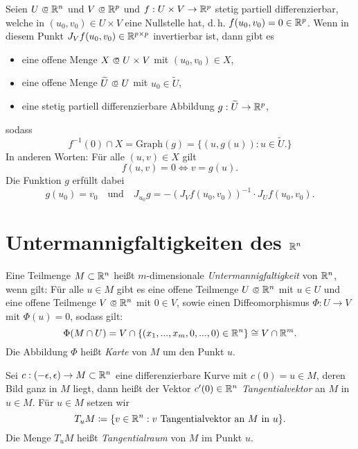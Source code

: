 \documentclass{cheat-sheet}
\newcommand\opn{\mathrel{\ooalign{$\subset$\cr
  \hidewidth\raise.1ex\hbox{$\circ\mkern.5mu$}\cr}}}
\begin{document}
\begin{samepage}

\begin{satz}
Seien $U \opn \R^n$ und $V \opn \R^p$ und $f : U \times V \to \mathbb{R}^p$ stetig partiell differenzierbar, welche in $(u_0, v_0) \in U \times V$ eine Nullstelle hat, d.\,h. $f(u_0, v_0) = 0 \in \mathbb{R}^p$. Wenn in diesem Punkt $J_V f(u_0, v_0) \in \mathbb{R}^{p \times p}$ invertierbar ist, dann gibt es
\begin{itemize}
  \item eine offene Menge $X \opn U \times V$ mit $(u_0, v_0) \in X$,
  \item eine offene Menge $\widetilde{U} \opn U$ mit $u_0 \in \widetilde{U}$,
  \item eine stetig partiell differenzierbare Abbildung $g : \widetilde{U} \to \mathbb{R}^p$,
\end{itemize}
sodass
\[ f^{-1}(0) \cap X = \mathrm{Graph}(g) = \{ (u, g(u)) : u \in \widetilde{U}. \} \]
In anderen Worten: Für alle $(u, v) \in X$ gilt
\[ f(u, v) = 0 \iff v = g(u). \]
Die Funktion $g$ erfüllt dabei
\[ g(u_0) = v_0\quad\text{und}\quad J_{u_0} g = - \left(J_V f(u_0, v_0)\right)^{-1} \cdot J_U f(u_0, v_0). \]
\end{satz}


\section{Untermannigfaltigkeiten des $\mathbb{R}^n$}

\end{samepage}

\begin{defn}
Eine Teilmenge $M \subset \mathbb{R}^n$ heißt $m$-dimensionale \emph{Untermannigfaltigkeit} von $\mathbb{R}^n$, wenn gilt: Für alle $u \in M$ gibt es eine offene Teilmenge $U \opn \R^n$ mit $u \in U$ und eine offene Teilmenge $V \opn \R^n$ mit $0 \in V$, sowie einen Diffeomorphismus $\Phi : U \to V$ mit $\Phi(u) = 0$, sodass gilt:
  \[ \Phi(M \cap U) = V \cap \{ (x_1, ..., x_m, 0, ..., 0) \in \mathbb{R}^n \} \cong V \cap \mathbb{R}^m. \]
Die Abbildung $\Phi$ heißt \emph{Karte} von $M$ um den Punkt $u$.
\end{defn}

\begin{defn}
Sei $c : (-\epsilon, \epsilon) \to M \subset \mathbb{R}^n$ eine differenzierbare Kurve mit $c(0) = u \in M$, deren Bild ganz in $M$ liegt, dann heißt der Vektor $c'(0) \in \mathbb{R}^n$ \emph{Tangentialvektor} an $M$ in $u \in M$. Für $u \in M$ setzen wir
\[ T_u M \coloneqq \{ v \in \mathbb{R}^n : v \text{ Tangentialvektor an } M \text{ in } u \}. \]
Die Menge $T_u M$ heißt \emph{Tangentialraum} von $M$ im Punkt $u$.
\end{defn}
\end{document}
